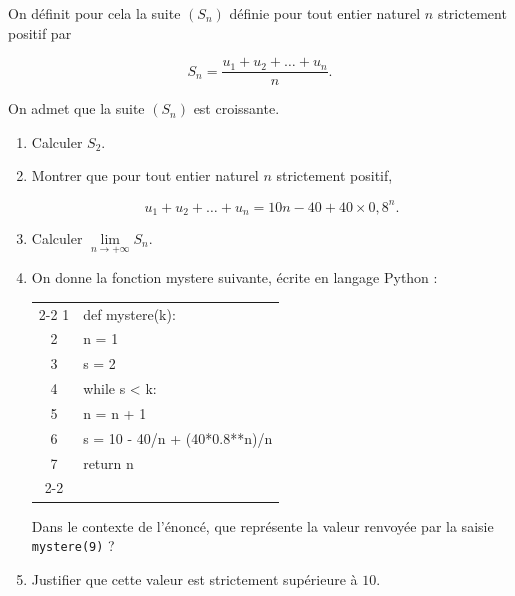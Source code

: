 On définit pour cela la suite $\left(S_n\right)$ définie pour tout entier naturel $n$ strictement positif par

\[S_n = \frac{u_1 + u_2 + \dots + u_n}{n}.\]

On admet que la suite $\left(S_n\right)$ est croissante.

\medskip

\begin{enumerate}
\item Calculer $S_2$.
\item Montrer que pour tout entier naturel $n$ strictement positif,

\[u_1 + u_2 + \dots + u_n = 10n - 40 + 40 \times 0{,}8^n.\]

\item Calculer $\lim\limits_{n \to +\infty} S_n$.
\item On donne la fonction mystere suivante, écrite en langage Python :

\begin{center}
\begin{tabular}{c|l|}\cline{2-2}
1&def mystere(k):\\
2&\quad n = 1\\
3&\quad s = 2\\
4&\quad while s < k:\\
5&\quad\qquad n = n + 1\\
6&\quad\qquad s = 10 - 40/n + (40*0.8**n)/n\\
7&\quad return n\\ \cline{2-2}
\end{tabular}
\end{center}

Dans le contexte de l'énoncé, que représente la valeur renvoyée par la saisie \texttt{mystere(9)} ? 
\item Justifier que cette valeur est strictement supérieure à $10$.
\end{enumerate}
